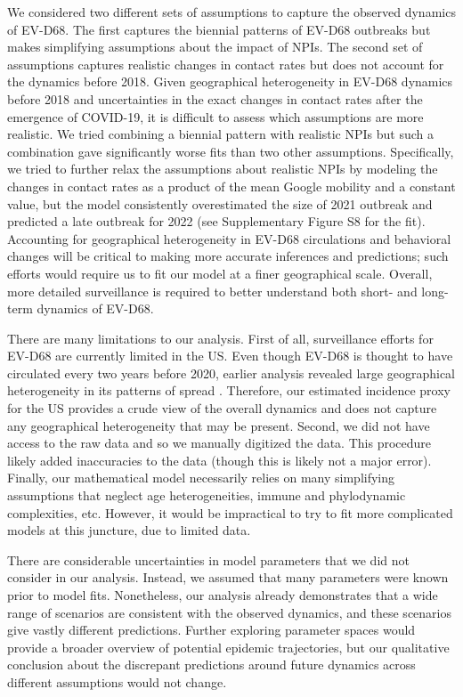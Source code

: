 \documentclass[12pt]{article}
\begin{document}
We considered two different sets of assumptions to capture the observed dynamics of EV-D68.
The first captures the biennial patterns of EV-D68 outbreaks but makes simplifying assumptions about the impact of NPIs.
The second set of assumptions captures realistic changes in contact rates but does not account for the dynamics before 2018.
Given geographical heterogeneity in EV-D68 dynamics before 2018 and uncertainties in the exact changes in contact rates after the emergence of COVID-19, it is difficult to assess which assumptions are more realistic.
We tried combining a biennial pattern with realistic NPIs but such a combination gave significantly worse fits than two other assumptions.
Specifically, we tried to further relax the assumptions about realistic NPIs by modeling the changes in contact rates as a product of the mean Google mobility and a constant value, but the model consistently overestimated the size of 2021 outbreak and predicted a late outbreak for 2022 (see Supplementary Figure S8 for the fit).
Accounting for geographical heterogeneity in EV-D68 circulations and behavioral changes will be critical to making more accurate inferences and predictions;
such efforts would require us to fit our model at a finer geographical scale.
Overall, more detailed surveillance is required to better understand both short- and long-term dynamics of EV-D68.

There are many limitations to our analysis.
First of all, surveillance efforts for EV-D68 are currently limited in the US.
Even though EV-D68 is thought to have circulated every two years before 2020, earlier analysis revealed large geographical heterogeneity in its patterns of spread \citep{park2021epidemiological}.
Therefore, our estimated incidence proxy for the US provides a crude view of the overall dynamics and does not capture any geographical heterogeneity that may be present.
Second, we did not have access to the raw data and so we manually digitized the data.
This procedure likely added inaccuracies to the data (though this is likely not a major error).
Finally, our mathematical model necessarily relies on many simplifying assumptions that neglect age heterogeneities, immune and phylodynamic complexities, etc.
However, it would be impractical to try to fit more complicated models at this juncture, due to limited data.

There are considerable uncertainties in model parameters that we did not consider in our analysis.
Instead, we assumed that many parameters were known prior to model fits.
Nonetheless, our analysis already demonstrates that a wide range of scenarios are consistent with the observed dynamics, and
these scenarios give vastly different predictions.
Further exploring parameter spaces would provide a broader overview of potential epidemic trajectories, but our qualitative conclusion about the discrepant predictions around future dynamics across different assumptions would not change.
\end{document}

